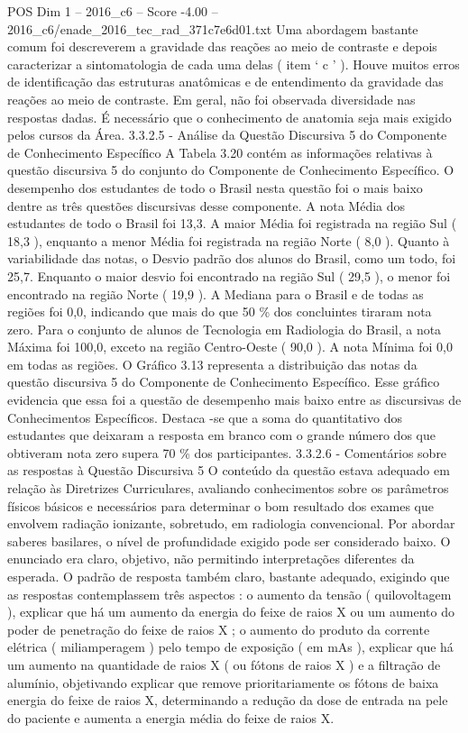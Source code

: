 \begin{textsample}{POS Dim 1 – 2016\_c6 – Score -4.00 – 2016\_c6/enade\_2016\_tec\_rad\_371c7e6d01.txt}
Uma abordagem bastante comum foi descreverem a gravidade das reações ao meio de contraste e depois caracterizar a sintomatologia de cada uma delas ( item ‘ c ’ ).
Houve muitos erros de identificação das estruturas anatômicas e de entendimento da gravidade das reações ao meio de contraste.
Em geral, não foi observada diversidade nas respostas dadas.
É necessário que o conhecimento de anatomia seja mais exigido pelos cursos da Área. 3.3.2.5 - Análise da Questão Discursiva 5 do Componente de Conhecimento Específico A Tabela 3.20 contém as informações relativas à questão discursiva 5 do conjunto do Componente de Conhecimento Específico.
O desempenho dos estudantes de todo o Brasil nesta questão foi o mais baixo dentre as três questões discursivas desse componente.
A nota Média dos estudantes de todo o Brasil foi 13,3.
A maior Média foi registrada na região Sul ( 18,3 ), enquanto a menor Média foi registrada na região Norte ( 8,0 ).
Quanto à variabilidade das notas, o Desvio padrão dos alunos do Brasil, como um todo, foi 25,7.
Enquanto o maior desvio foi encontrado na região Sul ( 29,5 ), o menor foi encontrado na região Norte ( 19,9 ).
A Mediana para o Brasil e de todas as regiões foi 0,0, indicando que mais do que 50 \% dos concluintes tiraram nota zero.
Para o conjunto de alunos de Tecnologia em Radiologia do Brasil, a nota Máxima foi 100,0, exceto na região Centro-Oeste ( 90,0 ).
A nota Mínima foi 0,0 em todas as regiões.
O Gráfico 3.13 representa a distribuição das notas da questão discursiva 5 do Componente de Conhecimento Específico.
Esse gráfico evidencia que essa foi a questão de desempenho mais baixo entre as discursivas de Conhecimentos Específicos.
Destaca -se que a soma do quantitativo dos estudantes que deixaram a resposta em branco com o grande número dos que obtiveram nota zero supera 70 \% dos participantes. 3.3.2.6 - Comentários sobre as respostas à Questão Discursiva 5 O conteúdo da questão estava adequado em relação às Diretrizes Curriculares, avaliando conhecimentos sobre os parâmetros físicos básicos e necessários para determinar o bom resultado dos exames que envolvem radiação ionizante, sobretudo, em radiologia convencional.
Por abordar saberes basilares, o nível de profundidade exigido pode ser considerado baixo.
O enunciado era claro, objetivo, não permitindo interpretações diferentes da esperada.
O padrão de resposta também claro, bastante adequado, exigindo que as respostas contemplassem três aspectos : o aumento da tensão ( quilovoltagem ), explicar que há um aumento da energia do feixe de raios X ou um aumento do poder de penetração do feixe de raios X ; o aumento do produto da corrente elétrica ( miliamperagem ) pelo tempo de exposição ( em mAs ), explicar que há um aumento na quantidade de raios X ( ou fótons de raios X ) e a filtração de alumínio, objetivando explicar que remove prioritariamente os fótons de baixa energia do feixe de raios X, determinando a redução da dose de entrada na pele do paciente e aumenta a energia média do feixe de raios X.

\end{textsample}
